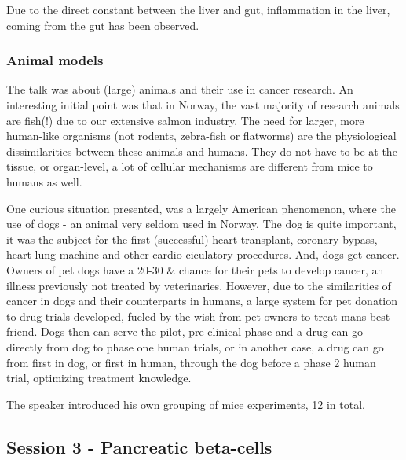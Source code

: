 \documentclass[12p]{article}
\begin{document}
Due to the direct constant between the liver and gut, inflammation in the liver, coming from the gut has been observed.

\subsubsection{Animal models}

The talk was about (large) animals and their use in cancer research.
An interesting initial point was that in Norway, the vast majority of research animals are fish(!) due to our extensive salmon industry.
The need for larger, more human-like organisms (not rodents, zebra-fish or flatworms) are the physiological dissimilarities between these animals and humans.
They do not have to be at the tissue, or organ-level, a lot of cellular mechanisms are different from mice to humans as well.

One curious situation presented, was a largely American phenomenon, where the use of dogs - an animal very seldom used in Norway.
The dog is quite important, it was the subject for the first (successful) heart transplant, coronary bypass, heart-lung machine and other cardio-ciculatory procedures.
And, dogs get cancer.
Owners of pet dogs have a 20-30 \& chance for their pets to develop cancer, an illness previously not treated by veterinaries.
However, due to the similarities of cancer in dogs and their counterparts in humans, a large system for pet donation to drug-trials developed, fueled by the wish from pet-owners to treat mans best friend.
Dogs then can serve the pilot, pre-clinical phase and a drug can go directly from dog to phase one human trials, or in another case, a drug can go from first in dog, or first in human, through the dog before a phase 2 human trial, optimizing treatment knowledge.

The speaker introduced his own grouping of mice experiments, 12 in total.

\subsection*{Session 3 - Pancreatic beta-cells}
\end{document}
